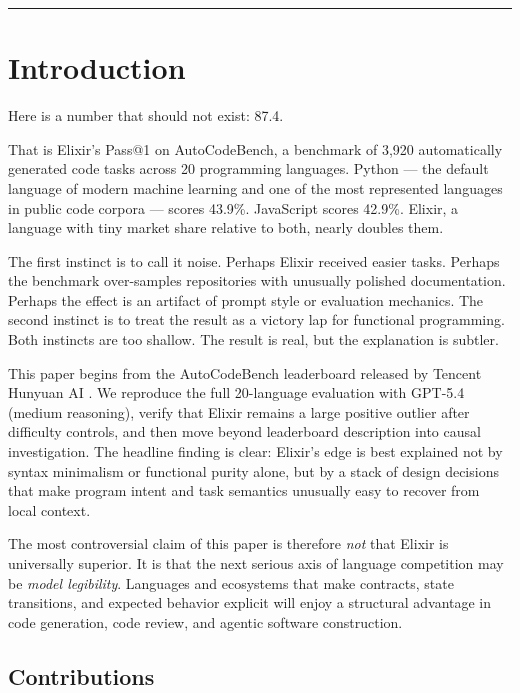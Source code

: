 \documentclass[11pt]{article}
\makeatletter
\newcommand{\acb}{AutoCodeBench}
\newcommand{\passatone}{Pass@1}
\newcommand{\elixir}{Elixir}
\newcommand{\pythonlang}{Python}
\makeatother
\begin{document}
\vspace{0.3em}
\noindent\rule{\textwidth}{0.4pt}
\vspace{0.6em}

\section{Introduction}

Here is a number that should not exist: 87.4.

That is \elixir{}'s \passatone{} on \acb{}, a benchmark of 3,920 automatically generated code tasks across 20 programming languages. \pythonlang{} --- the default language of modern machine learning and one of the most represented languages in public code corpora --- scores 43.9\%. JavaScript scores 42.9\%. \elixir{}, a language with tiny market share relative to both, nearly doubles them.

The first instinct is to call it noise. Perhaps \elixir{} received easier tasks. Perhaps the benchmark over-samples repositories with unusually polished documentation. Perhaps the effect is an artifact of prompt style or evaluation mechanics. The second instinct is to treat the result as a victory lap for functional programming. Both instincts are too shallow. The result is real, but the explanation is subtler.

This paper begins from the \acb{} leaderboard released by Tencent Hunyuan AI \cite{acb}. We reproduce the full 20-language evaluation with GPT-5.4 (medium reasoning), verify that \elixir{} remains a large positive outlier after difficulty controls, and then move beyond leaderboard description into causal investigation. The headline finding is clear: \elixir{}'s edge is best explained not by syntax minimalism or functional purity alone, but by a stack of design decisions that make program intent and task semantics unusually easy to recover from local context.

The most controversial claim of this paper is therefore \emph{not} that \elixir{} is universally superior. It is that the next serious axis of language competition may be \emph{model legibility}. Languages and ecosystems that make contracts, state transitions, and expected behavior explicit will enjoy a structural advantage in code generation, code review, and agentic software construction.

\subsection*{Contributions}
\end{document}
